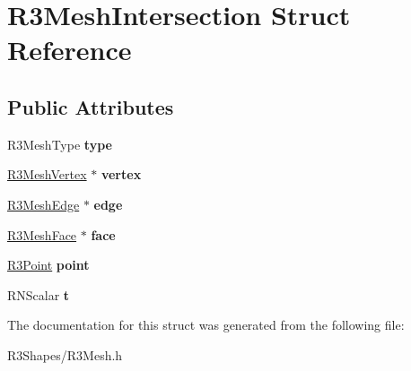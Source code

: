 \hypertarget{struct_r3_mesh_intersection}{}\section{R3\+Mesh\+Intersection Struct Reference}
\label{struct_r3_mesh_intersection}
\subsection*{Public Attributes}
\begin{DoxyCompactItemize}
\item 
R3\+Mesh\+Type {\bfseries type}\hypertarget{struct_r3_mesh_intersection_a41539ce955e5599a3ccf7e0f6f28b02a}{}\label{struct_r3_mesh_intersection_a41539ce955e5599a3ccf7e0f6f28b02a}

\item 
\hyperlink{class_r3_mesh_vertex}{R3\+Mesh\+Vertex} $\ast$ {\bfseries vertex}\hypertarget{struct_r3_mesh_intersection_a40326078e9411a4c902377cf3ce6e251}{}\label{struct_r3_mesh_intersection_a40326078e9411a4c902377cf3ce6e251}

\item 
\hyperlink{class_r3_mesh_edge}{R3\+Mesh\+Edge} $\ast$ {\bfseries edge}\hypertarget{struct_r3_mesh_intersection_adc241eb00bf4af0634b4a8a47ca60f26}{}\label{struct_r3_mesh_intersection_adc241eb00bf4af0634b4a8a47ca60f26}

\item 
\hyperlink{class_r3_mesh_face}{R3\+Mesh\+Face} $\ast$ {\bfseries face}\hypertarget{struct_r3_mesh_intersection_a28032da75a2d34c96a535f08e4b279fc}{}\label{struct_r3_mesh_intersection_a28032da75a2d34c96a535f08e4b279fc}

\item 
\hyperlink{class_r3_point}{R3\+Point} {\bfseries point}\hypertarget{struct_r3_mesh_intersection_a495e59245dff474345813545488d08ef}{}\label{struct_r3_mesh_intersection_a495e59245dff474345813545488d08ef}

\item 
R\+N\+Scalar {\bfseries t}\hypertarget{struct_r3_mesh_intersection_ad0d28077a9ffe3f6538353035585b97c}{}\label{struct_r3_mesh_intersection_ad0d28077a9ffe3f6538353035585b97c}

\end{DoxyCompactItemize}


The documentation for this struct was generated from the following file\+:\begin{DoxyCompactItemize}
\item 
R3\+Shapes/R3\+Mesh.\+h\end{DoxyCompactItemize}
